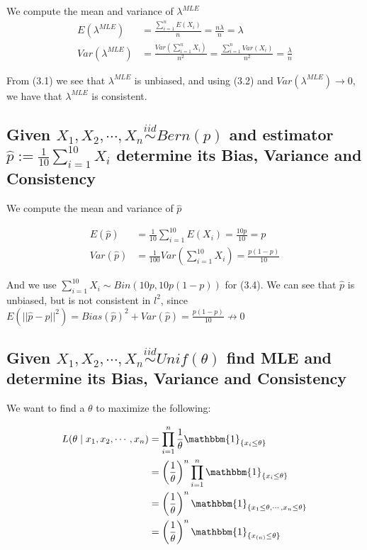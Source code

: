 \documentclass[paper=a4, fontsize=11pt]{scrartcl} %
\numberwithin{equation}{section} %
\numberwithin{figure}{section} %
\numberwithin{table}{section} %
\begin{document}
We compute the mean and variance of $\lambda^{MLE}$
\begin{align}
E(\lambda^{MLE}) &= \frac{\sum_{i=1}^n E(X_i)}{n} = \frac{n\lambda}{n} = \lambda \\
Var(\lambda^{MLE})&=\frac{Var(\sum_{i=1}^n X_i)}{n^2}=\frac{\sum_{i=1}^n Var(X_i)}{n^2}=\frac{\lambda}{n}
\end{align}

 From (3.1) we see that $\lambda^{MLE}$ is unbiased, and using (3.2) and $Var(\lambda^{MLE}) \rightarrow 0$, we have that $\lambda^{MLE}$ is consistent.

\subsection{Given $X_1, X_2, \cdots, X_n \overset{iid}{\sim} Bern(p)$ and estimator $\hat{p}:=\frac{1}{10}\sum_{i=1}^{10}X_i$ determine its  Bias, Variance and Consistency}

We compute the mean and variance of $\hat{p}$

\begin{align}
E(\hat{p})&=\frac{1}{10}\sum_{i=1}^{10}E(X_i) = \frac{10 p}{10}=p \\
Var(\hat{p}) &= \frac{1}{100}Var\left(\sum_{i=1}^{10}X_i\right) = \frac{p(1-p)}{10}
\end{align}

And we use $\sum_{i=1}^{10}X_i \sim Bin(10p, 10p(1-p))$ for (3.4). We can see that $\hat{p}$ is unbiased, but is not consistent in $l^2$, since $E(||\hat{p}-p||^2) = Bias(\hat{p})^2 + Var(\hat{p}) = \frac{p(1-p)}{10} \not\rightarrow 0$

\subsection{Given $X_1, X_2, \cdots, X_n \overset{iid}{\sim} Unif(\theta)$ find MLE and determine its Bias, Variance and Consistency}

We want to find a $\theta$ to maximize the following: 

\begin{align*}
L(\theta \mid x_1, x_2, \cdots, x_n) &= \prod_{i=1}^{n}\frac{1}{\theta}\mathbbm{1}_{\{x_i \le \theta\}} \\
&=\left(\frac{1}{\theta}\right)^n\prod_{i=1}^{n}\mathbbm{1}_{\{x_i \le \theta\}} \\
&=\left(\frac{1}{\theta}\right)^n\mathbbm{1}_{\{x_1 \le \theta, \cdots, x_n \le \theta\}} \\
&=\left(\frac{1}{\theta}\right)^n\mathbbm{1}_{\{x_{(n)} \le \theta\}}
\end{align*}
\end{document}
